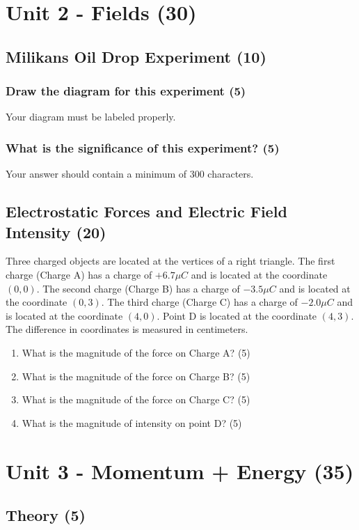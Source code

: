 \documentclass{article}
\begin{document}
\section{Unit 2 - Fields (30)}
\subsection{Milikans Oil Drop Experiment (10)}
\subsubsection{Draw the diagram for this experiment (5)}
Your diagram must be labeled properly.

\subsubsection{What is the significance of this experiment? (5)}
Your answer should contain a minimum of 300 characters.

\subsection{Electrostatic Forces and Electric Field Intensity (20)}
Three charged objects are located at the vertices of a right triangle. The first charge (Charge A) has a charge of $+6.7\mu C$ and is located at the coordinate $(0, 0)$. The second charge (Charge B) has a charge of $-3.5\mu C$ and is located at the coordinate $(0, 3)$. The third charge (Charge C) has a charge of $-2.0\mu C$ and is located at the coordinate $(4, 0)$. Point D is located at the coordinate $(4, 3)$. The difference in coordinates is measured in centimeters.
\begin{enumerate}[label=\alph*)]
    \item What is the magnitude of the force on Charge A? (5)
    \item What is the magnitude of the force on Charge B? (5)
    \item What is the magnitude of the force on Charge C? (5)
    \item What is the magnitude of intensity on point D? (5)
\end{enumerate}



\section{Unit 3 - Momentum + Energy (35)}
\subsection{Theory (5)}
\end{document}
